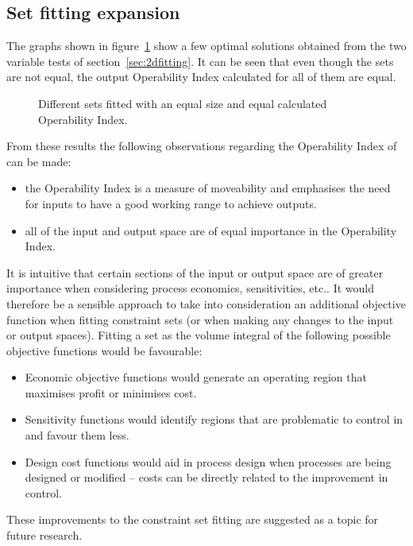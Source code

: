 \subsection{Set fitting expansion}\label{sec:setfitfuture}
The graphs shown in figure~\ref{fig:equaloifits} show a few optimal solutions obtained from the two variable tests of section~\ref{sec:2dfitting}.
It can be seen that even though the sets are not equal, the output Operability Index \citep{vinsonphd} calculated for all of them are equal.
\begin{figure}[htbp]
  \centering
    \scalebox{1}{}
    \scalebox{1}{}
  \caption[Equal size constraint set fits]{Different sets fitted with an equal size and equal calculated Operability Index.}
  \label{fig:equaloifits}
\end{figure}

From these results the following observations regarding the Operability Index of \citet{vinsonphd} can be made:
\begin{itemize}
\item the Operability Index is a measure of moveability and emphasises the need for inputs to have a good working range to achieve outputs.
\item all of the input and output space are of equal importance in the Operability Index.
\end{itemize}

It is intuitive that certain sections of the input or output space are of greater importance when considering process economics, sensitivities, etc..
It would therefore be a sensible approach to take into consideration an additional objective function when fitting constraint sets (or when making any changes to the input or output spaces).
Fitting a set as the volume integral of the following possible objective functions would be favourable:
\begin{itemize}
\item Economic objective functions would generate an operating region that maximises profit or minimises cost.
\item Sensitivity functions would identify regions that are problematic to control in and favour them less.
\item Design cost functions would aid in process design when processes are being designed or modified -- costs can be directly related to the improvement in control.
\end{itemize}
These improvements to the constraint set fitting are suggested as a topic for future research.

